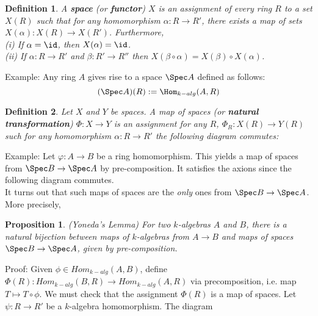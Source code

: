 \documentclass[10 pt]{article}
\newtheorem{prop}{Proposition}[section]
\newtheorem{defn}{Definition}[section]
\newcommand\bdefn{\begin{defn}}
\newcommand\bprop{\begin{prop}}
\newcommand\edefn{\end{defn}}
\newcommand\eprop{\end{prop}}
\begin{document}
\bdefn A {\bf space} (or {\bf functor}) $X$ is an assignment of every ring $R$ to a set $X(R)$ such that for any homomorphism $\alpha:R\rightarrow R'$, there exists a map of sets $X(\alpha):X(R)\rightarrow X(R')$.  Furthermore,\\
(i) If $\alpha=\id$, then $X(\alpha)=\id$.\\
(ii) If $\alpha:R\rightarrow R'$ and $\beta: R'\rightarrow R''$ then $X(\beta\circ \alpha)=X(\beta)\circ X(\alpha)$.\edefn

Example:  Any ring $A$ gives rise to a space $\Spec A$ defined as follows:
$$(\Spec A)(R):=\Hom_{k-alg}(A,R)$$

\bdefn Let $X$ and $Y$ be spaces.  A map of spaces (or {\bf natural transformation}) $\Phi:X\rightarrow Y$ is an assignment for any $R$, $\Phi_R:X(R)\rightarrow Y(R)$ such for any homomorphism $\alpha:R\rightarrow R'$ the following diagram commutes:
\edefn

Example:  Let $\varphi:A\rightarrow B$ be a ring homomorphism.  This yields a map of spaces from $\Spec B\rightarrow \Spec A$ by pre-composition.  It satisfies the axions since the following diagram commutes.\\

It turns out that such maps of spaces are the {\it only} ones from $\Spec B\rightarrow \Spec A$.  More precisely,

\bprop (Yoneda's Lemma) For two $k$-algebras $A$ and $B$, there is a natural bijection between maps of $k$-algebras from $A\rightarrow B$ and maps of spaces $\Spec B\rightarrow \Spec A$, given by pre-composition. \eprop

Proof:  Given $\phi\in Hom_{k-alg}(A,B)$, define $\Phi(R): Hom_{k-alg}(B,R) \rightarrow Hom_{k-alg}(A,R)$ via precomposition, i.e. map $T\longmapsto T\circ\phi$.  We must check that the assignment $\Phi(R)$ is a map of spaces.  Let $\psi:R\rightarrow R'$ be a $k$-algebra homomorphism.  The diagram\\

\end{document}
